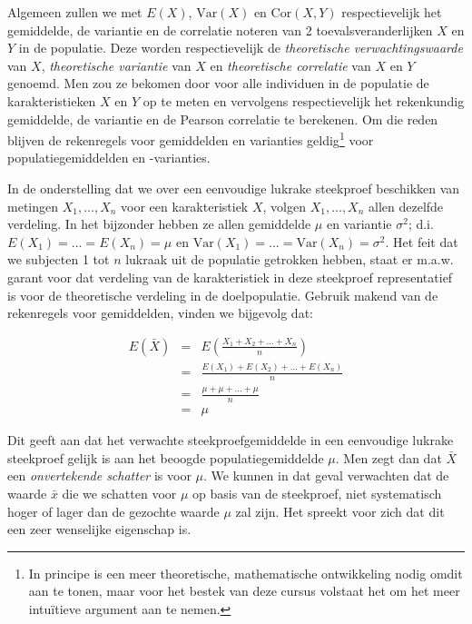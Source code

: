 \documentclass[
  12pt,dutch,coursenotes]{book}
\begin{document}
Algemeen zullen we met \(E(X)\), \(\text{Var}(X)\) en \(\text{Cor}(X,Y)\)
respectievelijk het gemiddelde, de variantie en de correlatie noteren van 2
toevalsveranderlijken \(X\) en \(Y\) in de populatie. Deze worden
respectievelijk de \emph{theoretische verwachtingswaarde} van \(X\), \emph{theoretische variantie} van \(X\) en \emph{theoretische correlatie} van \(X\) en \(Y\) genoemd.
Men zou ze bekomen door voor alle individuen in de populatie
de karakteristieken \(X\) en \(Y\) op te meten en vervolgens respectievelijk het
rekenkundig gemiddelde, de variantie en de Pearson correlatie te berekenen. Om die
reden blijven de rekenregels voor gemiddelden en varianties geldig\footnote{In principe is een meer theoretische, mathematische ontwikkeling nodig omdit aan te tonen, maar voor het bestek van deze cursus volstaat het om het
  meer intuïtieve argument aan te nemen.} voor populatiegemiddelden en
-varianties.

In de onderstelling dat we over een eenvoudige lukrake steekproef beschikken van metingen \(X_1,...,X_n\) voor een karakteristiek \(X\), volgen \(X_1,...,X_n\) allen dezelfde verdeling. In het
bijzonder hebben ze allen gemiddelde \(\mu\) en variantie \(\sigma^2\); d.i. \(E(X_1)=...=E(X_n)=\mu\) en \(\text{Var}(X_1)=...=\text{Var}(X_n)=\sigma^2\). Het feit
dat we subjecten 1 tot \(n\) lukraak uit de populatie getrokken hebben, staat
er m.a.w. garant voor dat verdeling van de karakteristiek in deze steekproef
representatief is voor de theoretische verdeling in de doelpopulatie.
Gebruik makend van de rekenregels voor gemiddelden, vinden we bijgevolg dat:

\begin{eqnarray*}
E(\bar X) &=& E \left(\frac{X_1+ X_2+ ... + X_n}{n}\right) \\
&= & \frac{E(X_1)+ E(X_2)+ ... + E(X_n)}{n} \\
&=& \frac{\mu + \mu + ... +\mu}{n} \\
&= & \mu
\end{eqnarray*}

Dit geeft aan dat het verwachte steekproefgemiddelde in een eenvoudige
lukrake steekproef gelijk is aan het beoogde populatiegemiddelde \(\mu\). Men
zegt dan dat \(\bar X\) een \emph{onvertekende schatter} is voor \(\mu\). We kunnen in
dat geval verwachten dat de waarde \(\bar x\) die we schatten voor \(\mu\) op
basis van de steekproef, niet systematisch hoger of lager dan de gezochte waarde \(\mu\) zal zijn. Het spreekt voor zich dat dit een zeer wenselijke eigenschap is.
\end{document}
